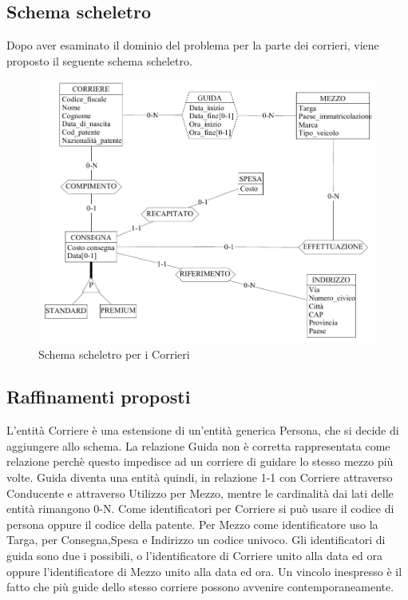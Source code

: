 \documentclass[a4paper,12pt]{report}
\begin{document}
\subsection{Schema scheletro}
Dopo aver esaminato il dominio del problema per la parte dei corrieri, viene proposto il seguente schema scheletro.
\begin{figure}[H]
	\centering{}
	\includegraphics[width=\textwidth]{img/SchemaConcettuale-Corrieri1.pdf}
	\caption{Schema scheletro per i Corrieri}
\end{figure}
\subsection{Raffinamenti proposti}
L'entità Corriere è una estensione di un'entità generica Persona, che si decide di aggiungere allo schema. 
La relazione Guida non è corretta rappresentata come relazione perchè questo impedisce ad un corriere di guidare lo stesso mezzo più volte. 
Guida diventa una entità quindi, in relazione 1-1 con Corriere attraverso Conducente e attraverso Utilizzo per Mezzo, mentre le cardinalità dai lati delle entità rimangono 0-N. 
Come identificatori per Corriere si può usare il codice di persona oppure il codice della patente. 
Per Mezzo come identificatore uso la Targa, per Consegna,Spesa e Indirizzo un codice univoco. 
Gli identificatori di guida sono due i possibili, o l'identificatore di Corriere unito alla data ed ora oppure l'identificatore di Mezzo unito alla data ed ora. 
Un vincolo inespresso è il fatto che più guide dello stesso corriere possono avvenire contemporaneamente. 
\end{document}
